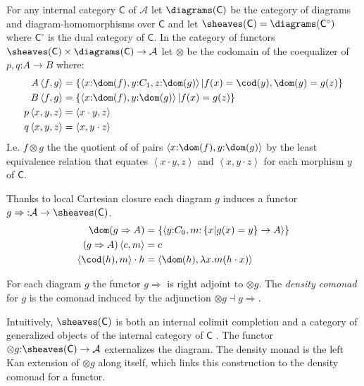 \documentclass{tac}
\newcommand\hide[1]{}
\newcommand\cat\mathcal
\newcommand\icat\mathsf
\newcommand\of{\mathord:}
\newcommand\set[1]{\left\{#1\right\}}
\newcommand\dual{^\circ}
\newcommand\tuplet[1]{\left\langle #1 \right\rangle}
\begin{document}
\begin{definition}
For any internal category $\icat C$ of $\cat A$ 
let $\diagrams(\icat C)$ be the category of diagrams and diagram-homomorphisms over $\icat C$ and let $\sheaves(\icat C) = \diagrams(\icat C\dual)$ where $\icat C\dual$ is the dual category of $\icat C$. In the category of functors $\sheaves(\icat C)\times\diagrams(\icat C) \to\cat A$ let $\otimes$ be the codomain of the coequalizer of 
$p,q\of A\to B$ where:
\begin{align*}
A\tuplet{f,g} &= \set{\tuplet{x\of \dom(f),y\of C_1,z\of\dom(g)}|f(x) = \cod(y), \dom(y) = g(z)}\\
B\tuplet{f,g} &= \set{\tuplet{x\of \dom(f),y\of\dom(g)}|f(x) = g(z)}\\
p\tuplet{x,y,z}&=\tuplet{x\cdot y,z}\\
q\tuplet{x,y,z}&=\tuplet{x,y\cdot z}
\end{align*}
I.e. $f\otimes g$ the the quotient of of pairs $\tuplet{x\of\dom(f),y\of\dom(g)}$ by the least equivalence relation that equates $\tuplet{x\cdot y,z}$ and $\tuplet{x, y\cdot z}$ for each morphism $y$ of $\icat C$.

Thanks to local Cartesian closure each diagram $g$ induces a functor $g\Rightarrow  \of \cat A\to \sheaves(\icat C)$.
\begin{align*}
\dom(g\Rightarrow A) &= \set{\tuplet{y\of C_0,m\of\set{x | g(x) = y}\to A}}\\
(g\Rightarrow A)\tuplet{c,m} &= c\\
 \tuplet{\cod(h),m}\cdot h &= \tuplet{\dom(h),\lambda x.m(h\cdot x)}
\end{align*}

For each diagram $g$ the functor $g\Rightarrow$ is right adjoint to $\otimes g$. 
The \emph{density comonad} for $g$ is the comonad induced by the adjunction $\otimes g\dashv g\Rightarrow$.
\end{definition}

Intuitively, $\sheaves(\icat C)$ is both an internal colimit completion and a category of generalized objects of the internal category of $\icat C$ . The functor $\otimes g\of \sheaves(\icat C) \to \cat A$ externalizes the diagram. The density monad is the left Kan extension of $\otimes g$ along itself, which links this construction to the density comonad for a functor.

\hide{
we will need to revisit the concepts and notions throughout this document

some guidelines:
- the greater the scope, the more descriptive the identifier
- keep refactoring
- define small generic components and compose them 
}
\end{document}
